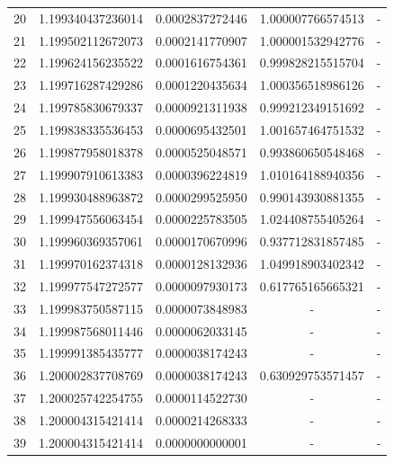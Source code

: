 \documentclass[titlepage,a4paper]{article}
\begin{document}
\begin{center}
\begin{tabular}{| c | l | c | c | c |}
    20      & 1.199340437236014  &  0.0002837272446  &  1.000007766574513  &  - \\
    21      & 1.199502112672073  &  0.0002141770907  &  1.000001532942776  &  - \\
    22      & 1.199624156235522  &  0.0001616754361  &  0.999828215515704  &  - \\
    23      & 1.199716287429286  &  0.0001220435634  &  1.000356518986126  &  - \\
    24      & 1.199785830679337  &  0.0000921311938  &  0.999212349151692  &  - \\
    25      & 1.199838335536453  &  0.0000695432501  &  1.001657464751532  &  - \\
    26      & 1.199877958018378  &  0.0000525048571  &  0.993860650548468  &  - \\
    27      & 1.199907910613383  &  0.0000396224819  &  1.010164188940356  &  - \\
    28      & 1.199930488963872  &  0.0000299525950  &  0.990143930881355  &  - \\
    29      & 1.199947556063454  &  0.0000225783505  &  1.024408755405264  &  - \\
    30      & 1.199960369357061  &  0.0000170670996  &  0.937712831857485  &  - \\
    31      & 1.199970162374318  &  0.0000128132936  &  1.049918903402342  &  - \\
    32      & 1.199977547272577  &  0.0000097930173  &  0.617765165665321  &  - \\
    33      & 1.199983750587115  &  0.0000073848983  &  -  &  - \\
    34      & 1.199987568011446  &  0.0000062033145  &  -  &  - \\
    35      & 1.199991385435777  &  0.0000038174243  &  -  &  - \\
    36      & 1.200002837708769  &  0.0000038174243  &  0.630929753571457  &  - \\
    37      & 1.200025742254755  &  0.0000114522730  &  -  &  - \\
    38      & 1.200004315421414  &  0.0000214268333  & - & - \\
    39      & 1.200004315421414  &  0.0000000000001  & - & - \\
    \hline
\end{tabular}
\end{center}
\end{document}
